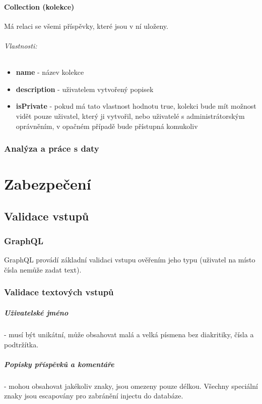 \documentclass[12pt, a4paper,
 twoside,        %
 openright
]{report}
\newenvironment{propertiesItemize}{
  \begin{itemize}  \begin{itemize}{ 
  }}
  {\end{itemize}\end{itemize}}
\begin{document}
    	            \subsubsection{Collection (kolekce)} Má relaci  se všemi příspěvky, které jsou v ní uloženy. 
	                        \subparagraph{Vlastnosti:}  
                           \begin{propertiesItemize}
                                \item \textbf{name} - název kolekce
                                \item \textbf{description} - uživatelem vytvořený popisek 
                                \item \textbf{isPrivate} - pokud má tato vlastnost hodnotu true, kolekci bude mít možnost vidět pouze uživatel, který ji vytvořil, nebo uživatelé s administrátorským oprávněním, v opačném případě bude přístupná komukoliv
                        \end{propertiesItemize}
  
        \subsection{Analýza a práce s daty}

\chapter{Zabezpečení}
\section{Validace vstupů}
\subsection{GraphQL}
GraphQL provádí základní validaci vstupu ověřením jeho typu (uživatel na místo čísla nemůže zadat text). 
\subsection{Validace textových vstupů}
\paragraph{Uživatelské jméno}\label{paragraph:username} - musí být unikátní, může obsahovat malá a velká písmena bez diakritiky, čísla a podtržítka.
\paragraph{Popisky příspěvků a komentáře} - mohou obsahovat jakékoliv znaky, jsou omezeny pouze délkou. Všechny speciální znaky jsou escapovány pro zabránění injectu do databáze.
\end{document}
